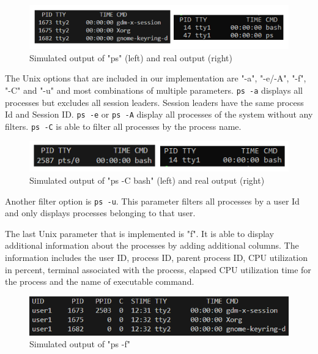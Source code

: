 \begin{figure}[H]
    \centering
    \includegraphics[width=1\linewidth]{bilder/real_and_fake_ps.png}
    \caption{Simulated output of "ps" (left) and real output (right)}
    \label{fig:outputps}
\end{figure}

The Unix options that are included in our implementation are "-a", "-e/-A", "-f", "-C" and "-u" and most combinations of multiple parameters. \texttt{ps -a} displays all processes but excludes all session leaders. Session leaders have the same process Id and Session ID. \texttt{ps -e}  or \texttt{ps -A} display all processes of the system without any filters. \texttt{ps -C} is able to filter all processes by the process name\cite{noauthor_ps1_2024}.

\begin{figure}[H]
    \centering
    \includegraphics[width=1\linewidth]{bilder/real_and_fake_psC.png}
    \caption{Simulated output of "ps -C bash" (left) and real output (right)}
    \label{fig:enter-label}
\end{figure}

Another filter option is \texttt{ps -u}. This parameter filters all processes by a user Id and only displays processes belonging to that user\cite{noauthor_ps1_2024}.

The last Unix parameter that is implemented is "f". It is able to display additional information about the processes by adding additional columns. The information includes the user ID, process ID, parent process ID, CPU utilization in percent, terminal associated with the process, elapsed CPU utilization time for the process and the name of executable command\cite{noauthor_ps1_2024}.

\begin{figure}[H]
    \centering
    \includegraphics[width=1\linewidth]{bilder/fake_psf.png}
    \caption{Simulated output of "ps -f"}
    \label{fig:enter-label}
\end{figure}

